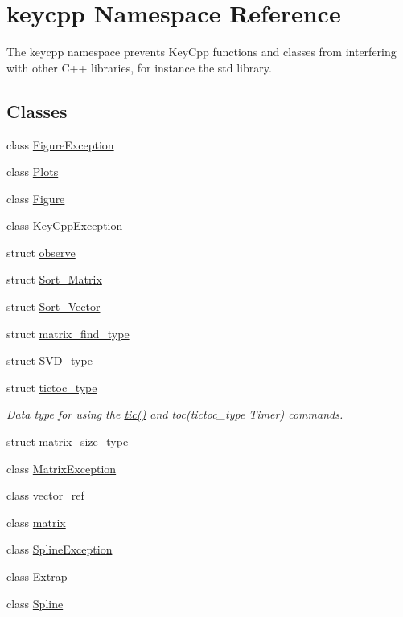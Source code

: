 \hypertarget{namespacekeycpp}{\section{keycpp Namespace Reference}
\label{namespacekeycpp}
}


The keycpp namespace prevents Key\-Cpp functions and classes from interfering with other C++ libraries, for instance the std library.  


\subsection*{Classes}
\begin{DoxyCompactItemize}
\item 
class \hyperlink{classkeycpp_1_1_figure_exception}{Figure\-Exception}
\item 
class \hyperlink{classkeycpp_1_1_plots}{Plots}
\item 
class \hyperlink{classkeycpp_1_1_figure}{Figure}
\item 
class \hyperlink{classkeycpp_1_1_key_cpp_exception}{Key\-Cpp\-Exception}
\item 
struct \hyperlink{structkeycpp_1_1observe}{observe}
\item 
struct \hyperlink{structkeycpp_1_1_sort___matrix}{Sort\-\_\-\-Matrix}
\item 
struct \hyperlink{structkeycpp_1_1_sort___vector}{Sort\-\_\-\-Vector}
\item 
struct \hyperlink{structkeycpp_1_1matrix__find__type}{matrix\-\_\-find\-\_\-type}
\item 
struct \hyperlink{structkeycpp_1_1_s_v_d__type}{S\-V\-D\-\_\-type}
\item 
struct \hyperlink{structkeycpp_1_1tictoc__type}{tictoc\-\_\-type}
\begin{DoxyCompactList}\small\item\em Data type for using the \hyperlink{namespacekeycpp_a6069a9eec0edfa1d401230013d98765e}{tic()} and toc(tictoc\-\_\-type Timer) commands. \end{DoxyCompactList}\item 
struct \hyperlink{structkeycpp_1_1matrix__size__type}{matrix\-\_\-size\-\_\-type}
\item 
class \hyperlink{classkeycpp_1_1_matrix_exception}{Matrix\-Exception}
\item 
class \hyperlink{classkeycpp_1_1vector__ref}{vector\-\_\-ref}
\item 
class \hyperlink{classkeycpp_1_1matrix}{matrix}
\item 
class \hyperlink{classkeycpp_1_1_spline_exception}{Spline\-Exception}
\item 
class \hyperlink{classkeycpp_1_1_extrap}{Extrap}
\item 
class \hyperlink{classkeycpp_1_1_spline}{Spline}
\end{DoxyCompactItemize}
